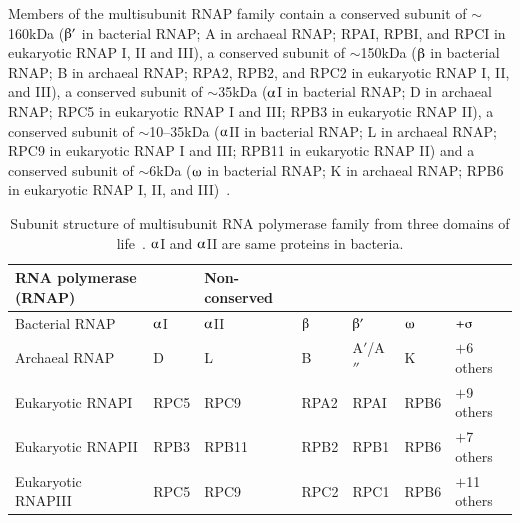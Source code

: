 Members of the multisubunit RNAP family contain a conserved
subunit of \U{$\sim$160}{kDa} ($\betaup'$ in bacterial RNAP; A in
archaeal RNAP; RPAI, RPBI, and RPCI in eukaryotic RNAP I, II and
III), a conserved subunit of \U{$\sim$150}{kDa} ($\betaup$ in
bacterial RNAP; B in archaeal RNAP; RPA2, RPB2, and RPC2 in
eukaryotic RNAP I, II, and III), a conserved subunit of
\U{$\sim$35}{kDa} ($\alphaup$I in bacterial RNAP; D in archaeal
RNAP; RPC5 in eukaryotic RNAP I and III; RPB3 in eukaryotic RNAP
II), a conserved subunit of \U{$\sim$10--35}{kDa} ($\alphaup$II in
bacterial RNAP; L in archaeal RNAP; RPC9 in eukaryotic RNAP I and
III; RPB11 in eukaryotic RNAP II) and a conserved subunit of
\U{$\sim$6}{kDa} ($\omegaup$ in bacterial RNAP; K in archaeal
RNAP; RPB6 in eukaryotic RNAP I, II, and
III)~\citep[][Table~\ref{pol_subunit}]{Ebright2000,Young1991}.

\begin{table}[tbp]
\linespread{1}\normalsize
\renewcommand{\arraystretch}{1.5}
\begin{minipage}[c]{\textwidth}
\renewcommand{\footnoterule}{}
\renewcommand{\footnotesep}{0pt}
\caption[Subunits structure of RNA polymerase]{Subunit structure
of multisubunit RNA polymerase family from three domains of
life~\citep{Ebright2000,Young1991}. $\alphaup$I and $\alphaup$II
are same proteins in bacteria.} \label{pol_subunit}
\begin{narrow}{-1in}{-1in}
\centering
\begin{small}
\begin{tabularx}{5.75in}{@{}>{\raggedright\arraybackslash}p{1.5in}%
>{\raggedright\arraybackslash}X%
>{\raggedright\arraybackslash}X%
>{\raggedright\arraybackslash}X%
>{\raggedright\arraybackslash}X%
>{\raggedright\arraybackslash}X%
>{\raggedright\arraybackslash}p{1in}%
@{}}\toprule \textbf{RNA polymerase (RNAP)} &
\multicolumn{5}{c}{\textbf{Conserved subunits}} &
\textbf{Non-conserved}\\\midrule Bacterial RNAP & $\alphaup$I &
$\alphaup$II & $\betaup$ & $\betaup'$
& $\omegaup$ & $+\sigmaup$\\
Archaeal RNAP & D & L & B & A$'$/A$''$ & K & $+$6 others \\
Eukaryotic RNAPI & RPC5 & RPC9 & RPA2 & RPAI & RPB6 & $+$9 others
\\
Eukaryotic RNAPII & RPB3 & RPB11 & RPB2 & RPB1 & RPB6 & $+$7
others \\
Eukaryotic RNAPIII & RPC5 & RPC9 & RPC2 & RPC1 & RPB6 & $+$11
others \\\bottomrule
\end{tabularx}
\end{small}
\end{narrow}
\end{minipage}
\renewcommand{\arraystretch}{1.0}
\linespread{1.1}\normalsize
\end{table}


